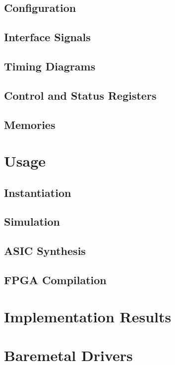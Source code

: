 \documentclass{ug}
\begin{document}
\ifdefined\CONFS
\subsection{Configuration}
\label{sec:ipconfig}

\fi

\subsection{Interface Signals}
\label{sec:ifsig}


\ifdefined\TD
\subsection{Timing Diagrams}
\label{sec:td}

\fi

\ifdefined\CSRS
\subsection{Control and Status Registers}
\label{sec:csrs}

\fi

\ifdefined\MEMS
\subsection{Memories}
\label{sec:mems}

\fi

\ifdefined\SECTIONCLEARPAGE
\clearpage
\fi
\section{Usage}

\subsection{Instantiation}
\label{sec:inst}


\subsection{Simulation}
\label{sec:tbbd}


\ifdefined\ASICSYNTH
\subsection{ASIC Synthesis}
\label{sec:synth}

\fi

\ifdefined\FPGACOMP
\subsection{FPGA Compilation}
\label{sec:fpga}

\fi

\ifdefined\RESULTS
\ifdefined\SECTIONCLEARPAGE
\clearpage
\fi
\section{Implementation Results}
\label{sec:results}

\fi

\ifdefined\DOXYGEN
\section{Baremetal Drivers}
\label{sec:baremetal}

\fi

\ifdefined\CUSTOM

\fi
\end{document}
